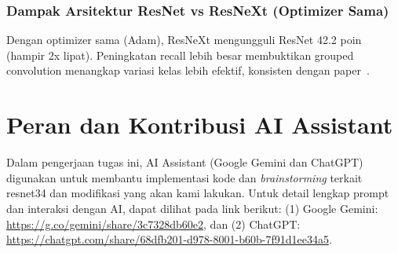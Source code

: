 \documentclass[11pt,a4paper]{article}
\begin{document}
\subsubsection{Dampak Arsitektur ResNet vs ResNeXt (Optimizer Sama)}
Dengan optimizer sama (Adam), ResNeXt mengungguli ResNet 42.2 poin (hampir 2x lipat). Peningkatan recall lebih besar membuktikan grouped convolution menangkap variasi kelas lebih efektif, konsisten dengan paper~\cite{xie2017aggregated}.

\section{Peran dan Kontribusi AI Assistant}

Dalam pengerjaan tugas ini, AI Assistant (Google Gemini dan ChatGPT) digunakan untuk membantu 
implementasi kode dan \textit{brainstorming} terkait resnet34 dan modifikasi yang akan kami lakukan. 
Untuk detail lengkap prompt dan interaksi dengan AI, dapat dilihat pada link berikut: (1) Google Gemini: \url{https://g.co/gemini/share/3c7328db60e2}, 
dan (2) ChatGPT: \url{https://chatgpt.com/share/68dfb201-d978-8001-b60b-7f91d1ee34a5}.

\newpage


\end{document}
